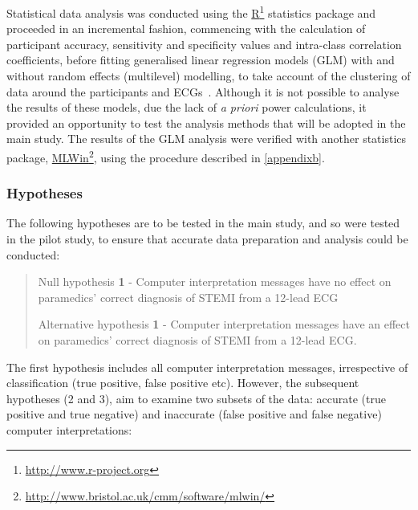 Statistical data analysis was conducted using the \href{http://www.r-project.org}{R}\footnote{\href{http://www.r-project.org}{http:/\slash www.r-project.org}} statistics package and proceeded in an incremental fashion, commencing with the calculation of participant accuracy, sensitivity and specificity values and intra-class correlation coefficients, before fitting generalised linear regression models (GLM) with and without random effects (multilevel) modelling, to take account of the clustering of data around the participants and ECGs~\citep{petrie_medical_2000}. Although it is not possible to analyse the results of these models, due the lack of \emph{a priori} power calculations, it provided an opportunity to test the analysis methods that will be adopted in the main study. The results of the GLM analysis were verified with another statistics package, \href{http://www.bristol.ac.uk/cmm/software/mlwin/}{MLWin}\footnote{\href{http://www.bristol.ac.uk/cmm/software/mlwin/}{http:/\slash www.bristol.ac.uk\slash cmm\slash software\slash mlwin\slash }}, using the procedure described in \autoref{appendixb}.

\subsubsection{Hypotheses}
\label{hypotheses}

The following hypotheses are to be tested in the main study, and so were tested in the pilot study, to ensure that accurate data preparation and analysis could be conducted:

\begin{quote}

Null hypothesis \textbf{1} - Computer interpretation messages have no effect on paramedics' correct diagnosis of STEMI from a 12-lead ECG 

Alternative hypothesis \textbf{1} - Computer interpretation messages have an effect on paramedics' correct diagnosis of STEMI from a 12-lead ECG.
\end{quote}

The first hypothesis includes all computer interpretation messages, irrespective of classification (true positive, false positive etc). However, the subsequent hypotheses (2 and 3), aim to examine two subsets of the data: accurate (true positive and true negative) and inaccurate (false positive and false negative) computer interpretations: 

